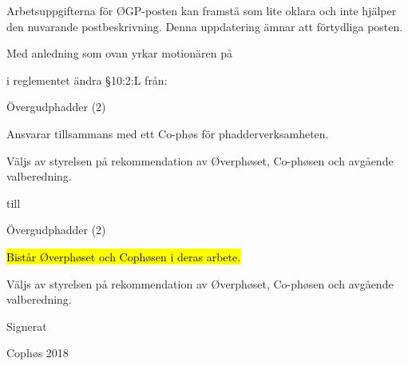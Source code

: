 \documentclass[../_main/handlingar.tex]{subfiles}
\begin{document}
Arbetsuppgifterna för ØGP-posten kan framstå som lite oklara och inte hjälper den nuvarande
postbeskrivning. Denna uppdatering ämnar att förtydliga posten.

Med anledning som ovan yrkar motionären på

\begin{attsatser}
  \att i reglementet ändra \S10:2:L från:\par
  \begin{emptylist}
    \item Övergudphadder (2)
      \begin{dashlist}
        \item Ansvarar tillsammans med ett Co-phøs för phadderverksamheten.
        \item Väljs av styrelsen på rekommendation av Øverphøset, Co-phøsen och avgående
        valberedning.
      \end{dashlist}
    \end{emptylist}
    
    till 
    
    \begin{emptylist}
        \item Övergudphadder (2)
        \begin{dashlist}
          \item \hl{Bistår Øverphøset och Cophøsen i deras arbete.}
          \item Väljs av styrelsen på rekommendation av Øverphøset, Co-phøsen och avgående
          valberedning.
        \end{dashlist}
    \end{emptylist}
  \changenote
\end{attsatser}




\begin{signatures}{1}
    Signerat
    \signature{Edvard Carlsson}{Cophøs 2018}

\end{signatures}
\end{document}
